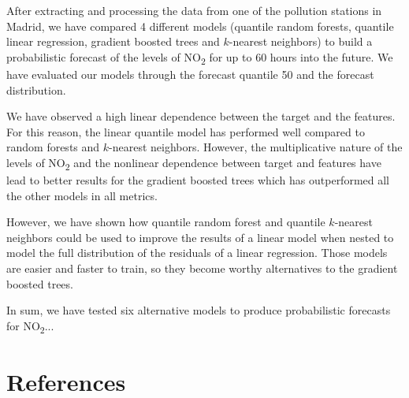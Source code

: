 \documentclass[a4paper,twocolumn,5p]{elsarticle}
\begin{document}
After extracting and processing the data from one of the pollution
stations in Madrid, we have compared 4 different models (quantile
random forests, quantile linear regression, gradient boosted trees and
$k$-nearest neighbors) to build a probabilistic forecast of the levels
of NO\textsubscript{2} for up to 60 hours into the future. We have
evaluated our models through the forecast quantile 50 and the forecast
distribution.

We have observed a high linear dependence between the target and the
features. For this reason, the linear quantile model has performed
well compared to random forests and $k$-nearest neighbors. However,
the multiplicative nature of the levels of NO\textsubscript{2} and the
nonlinear dependence between target and features have lead to better
results for the gradient boosted trees which has outperformed all the
other models in all metrics.

However, we have shown how quantile random forest and quantile
$k$-nearest neighbors could be used to improve the results of a linear
model when nested to model the full distribution of the residuals of a
linear regression. Those models are easier and faster to train, so
they become worthy alternatives to the gradient boosted trees.

In sum, we have tested six alternative models to produce probabilistic
forecasts for NO\textsubscript{2}... 

\section{References}


\end{document}
